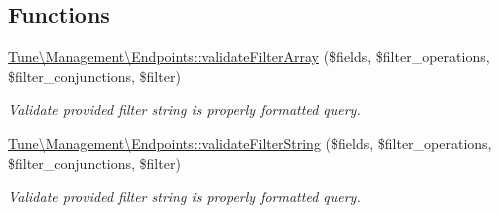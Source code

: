 \subsection*{Functions}
\begin{DoxyCompactItemize}
\item 
\hyperlink{namespaceTune_1_1Management_1_1Endpoints_ae2d0d6742ce18cb5d94c1e0fb5ebdabe}{Tune\textbackslash{}\-Management\textbackslash{}\-Endpoints\-::validate\-Filter\-Array} (\$fields, \$filter\-\_\-operations, \$filter\-\_\-conjunctions, \$filter)
\begin{DoxyCompactList}\small\item\em Validate provided filter string is properly formatted query. \end{DoxyCompactList}\item 
\hyperlink{namespaceTune_1_1Management_1_1Endpoints_a8a3f8f7bc986da92a05b19f9ca804e2d}{Tune\textbackslash{}\-Management\textbackslash{}\-Endpoints\-::validate\-Filter\-String} (\$fields, \$filter\-\_\-operations, \$filter\-\_\-conjunctions, \$filter)
\begin{DoxyCompactList}\small\item\em Validate provided filter string is properly formatted query. \end{DoxyCompactList}\end{DoxyCompactItemize}
